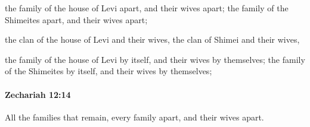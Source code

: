 			\begin{versebox}
					\item[BHS] 
					\item[LXX] 
					\item[ASV] the family of the house of Levi apart, and their wives apart; the family of the Shimeites apart, and their wives apart;
					\item[NIV] the clan of the house of Levi and their wives, the clan of Shimei and their wives,
					\item[NRSV] the family of the house of Levi by itself, and their wives by themselves; the family of the Shimeites by itself, and their wives by themselves;
			\end{versebox}

		\paragraph{Zechariah 12:14} %
			\label{ZECHARIAH-12-14}

			All the families that remain, every family apart, and their wives apart.

